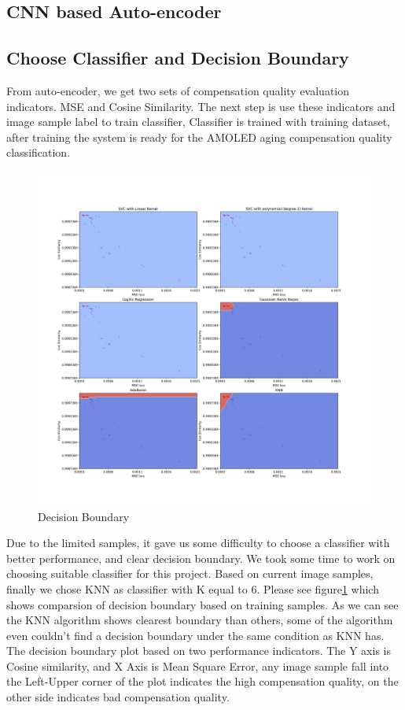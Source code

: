 \documentclass[runningheads]{llncs}
\begin{document}
\subsection{CNN based Auto-encoder}

\subsection{Choose Classifier and Decision Boundary}
From auto-encoder, we get two sets of compensation quality evaluation indicators. MSE and Cosine Similarity. The next step is use these indicators and image sample label to train classifier, Classifier is trained with training dataset, after training the system is ready for the AMOLED aging compensation quality classification.\\
\begin{figure}
    \centering
    \includegraphics[width=1.2\textwidth]{decision-boundary.png}
    \caption{Decision Boundary}
    \label{fig:5}
\end{figure}
Due to the limited samples, it gave us some difficulty to choose a classifier with better performance, and clear decision boundary. We took some time to work on choosing suitable classifier for this project. Based on current image samples, finally we chose KNN as classifier with K equal to 6. Please see figure\ref{fig:5} which shows comparsion of decision boundary based on training samples. As we can see the KNN algorithm shows clearest boundary than others, some of the algorithm even couldn't find a decision boundary under the same condition as KNN has. The decision boundary plot based on two performance indicators. The Y axis is Cosine similarity, and X Axis is Mean Square Error, any image sample fall into the Left-Upper corner of the plot indicates the high compensation quality, on the other side indicates bad compensation quality.\\
\end{document}
